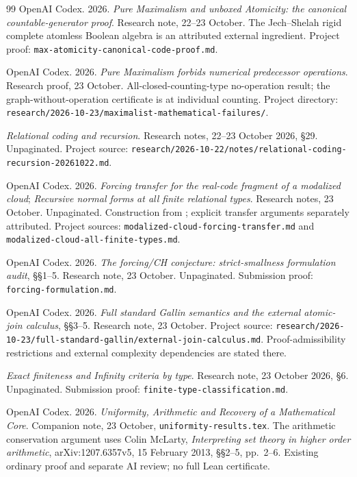 \documentclass[12pt,letterpaper]{article}
\begin{document}
\begin{thebibliography}{99}
OpenAI Codex. 2026. \emph{Pure Maximalism and unboxed Atomicity: the canonical countable-generator proof}. Research note, 22--23 October. The Jech--Shelah rigid complete atomless Boolean algebra is an attributed external ingredient. Project proof: \nolinkurl{max-atomicity-canonical-code-proof.md}.

OpenAI Codex. 2026. \emph{Pure Maximalism forbids numerical predecessor operations}. Research proof, 23 October. All-closed-counting-type no-operation result; the graph-without-operation certificate is at individual counting. Project directory: \nolinkurl{research/2026-10-23/maximalist-mathematical-failures/}.

\emph{Relational coding and recursion}. Research notes, 22--23 October 2026, \S29. Unpaginated. Project source: \nolinkurl{research/2026-10-22/notes/relational-coding-recursion-20261022.md}.

OpenAI Codex. 2026. \emph{Forcing transfer for the real-code fragment of a modalized cloud}; \emph{Recursive normal forms at all finite relational types}. Research notes, 23 October. Unpaginated. Construction from \citet{modalized}; explicit transfer arguments separately attributed. Project sources: \nolinkurl{modalized-cloud-forcing-transfer.md} and \nolinkurl{modalized-cloud-all-finite-types.md}.

OpenAI Codex. 2026. \emph{The forcing/CH conjecture: strict-smallness formulation audit}, \S\S1--5. Research note, 23 October. Unpaginated. Submission proof: \nolinkurl{forcing-formulation.md}.

OpenAI Codex. 2026. \emph{Full standard Gallin semantics and the external atomic-join calculus}, \S\S3--5. Research note, 23 October. Project source: \nolinkurl{research/2026-10-23/full-standard-gallin/external-join-calculus.md}. Proof-admissibility restrictions and external complexity dependencies are stated there.

\emph{Exact finiteness and Infinity criteria by type}. Research note, 23 October 2026, \S6. Unpaginated. Submission proof: \nolinkurl{finite-type-classification.md}.

OpenAI Codex. 2026. \emph{Uniformity, Arithmetic and Recovery of a Mathematical Core}. Companion note, 23 October, \nolinkurl{uniformity-results.tex}. The arithmetic conservation argument uses Colin McLarty, \emph{Interpreting set theory in higher order arithmetic}, arXiv:1207.6357v5, 15 February 2013, \S\S2--5, pp.~2--6. Existing ordinary proof and separate AI review; no full Lean certificate.


\end{thebibliography}
\end{document}
